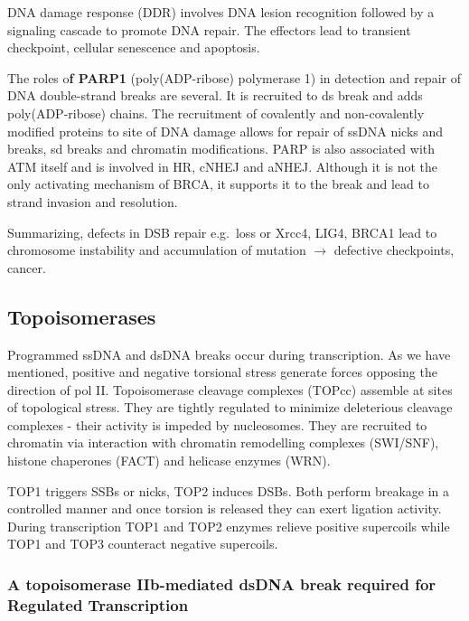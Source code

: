 DNA damage response (DDR) involves DNA lesion recognition followed by a signaling cascade to promote DNA repair. The effectors lead to transient checkpoint, cellular senescence and apoptosis.

The roles o\textbf{f PARP1} (poly(ADP-ribose) polymerase 1) in detection and repair of DNA double-strand breaks are several. It is recruited to ds break and adds poly(ADP-ribose) chains. The recruitment of covalently and non-covalently modified proteins to site of DNA damage allows for repair of ssDNA nicks and breaks, sd breaks and chromatin modifications. PARP is also associated with ATM itself and is involved in HR, cNHEJ and aNHEJ. Although it is not the only activating mechanism of BRCA, it supports it to the break and lead to strand invasion and resolution.

Summarizing, defects in DSB repair e.g.~loss or Xrcc4, LIG4, BRCA1 lead to chromosome instability and accumulation of mutation $\rightarrow$ defective checkpoints, cancer.

\hypertarget{topoisomerases}{%
\subsection{Topoisomerases}\label{topoisomerases}}

Programmed ssDNA and dsDNA breaks occur during transcription. As we have mentioned, positive and negative torsional stress generate forces opposing the direction of pol II. Topoisomerase cleavage complexes (TOPcc) assemble at sites of topological stress. They are tightly regulated to minimize deleterious cleavage complexes - their activity is impeded by nucleosomes. They are recruited to chromatin via interaction with chromatin remodelling complexes (SWI/SNF), histone chaperones (FACT) and helicase enzymes (WRN).

TOP1 triggers SSBs or nicks, TOP2 induces DSBs. Both perform breakage in a controlled manner and once torsion is released they can exert ligation activity. During transcription TOP1 and TOP2 enzymes relieve positive supercoils while TOP1 and TOP3 counteract negative supercoils.

\hypertarget{a-topoisomerase-iib-mediated-dsdna-break-required-for-regulated-transcription}{%
\subsubsection{A topoisomerase IIb-mediated dsDNA break required for Regulated Transcription}\label{a-topoisomerase-iib-mediated-dsdna-break-required-for-regulated-transcription}}

